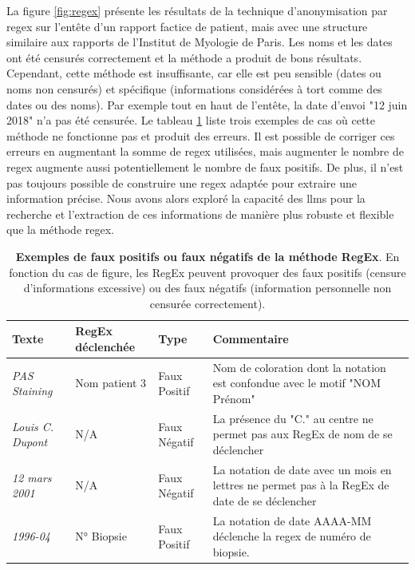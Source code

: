 La figure \ref{fig:regex} présente les résultats de la technique d'anonymisation par \gls{regex} sur l'entête d'un rapport factice de patient, mais avec une structure similaire aux rapports de l'Institut de Myologie de Paris. Les noms et les dates ont été censurés correctement et la méthode a produit de bons résultats. Cependant, cette méthode est insuffisante, car elle est peu sensible (dates ou noms non censurés) et spécifique (informations considérées à tort comme des dates ou des noms). Par exemple tout en haut de l'entête, la date d'envoi "12 juin 2018" n'a pas été censurée. Le tableau \ref{tab:regex_fail} liste trois exemples de cas où cette méthode ne fonctionne pas et produit des erreurs. Il est possible de corriger ces erreurs en augmentant la somme de \gls{regex} utilisées, mais augmenter le nombre de \gls{regex} augmente aussi potentiellement le nombre de faux positifs. De plus, il n'est pas toujours possible de construire une \gls{regex} adaptée pour extraire une information précise. Nous avons alors exploré la capacité des \gls{llms} pour la recherche et l'extraction de ces informations de manière plus robuste et flexible que la méthode \gls{regex}.
\begin{table}[!ht]
\centering
\caption[Exemples de faux positifs ou faux négatifs de la méthode RegEx]{\textbf{Exemples de faux positifs ou faux négatifs de la méthode RegEx}. En fonction du cas de figure, les RegEx peuvent provoquer des faux positifs (censure d'informations excessive) ou des faux négatifs (information personnelle non censurée correctement).}
\label{tab:regex_fail}
\begin{tabularx}{\textwidth}{|l|l|l|X|}
\hline
\textbf{Texte} & \textbf{RegEx déclenchée} & \textbf{Type} & \textbf{Commentaire} \\ \hline
\textit{PAS Staining} & Nom patient 3 & Faux Positif & Nom de coloration dont la notation est confondue avec le motif "NOM Prénom" \\ \hline
\textit{Louis C. Dupont} & N/A & Faux Négatif & La présence du "C." au centre ne permet pas aux RegEx de nom de se déclencher \\ \hline
\textit{12 mars 2001} & N/A & Faux Négatif & La notation de date avec un mois en lettres ne permet pas à la RegEx de date de se déclencher \\ \hline
\textit{1996-04} & N° Biopsie & Faux Positif & La notation de date AAAA-MM déclenche la \gls{regex} de numéro de biopsie. \\ \hline
\end{tabularx}
\end{table}

